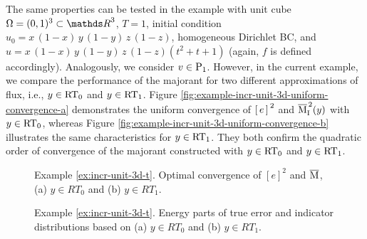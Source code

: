 \begin{example}
\end{example}

\begin{example}
\label{ex:incr-unit-3d-t}

The same properties can be tested in the example with unit cube 
$\Omega = (0, 1)^3 \subset \Rthree$, 
$T = 1$, initial condition $u_0 = x\,(1 - x)\,y\,(1 - y)\,z\,(1 - z)$, 
homogeneous Dirichlet BC, and  
$u = x\,(1 - x)\,y\,(1 - y)\,z\,(1 - z)(t^2 + t + 1)$ (again, $f$ is defined accordingly). 
Analogously, we consider $v \in {\rm P}_{1}$. However, in the current example, we compare the performance of the 
majorant for two different approximations of flux, i.e., $y \in {\rm RT}_{0}$ and $y \in {\rm RT}_{1}$. 
Figure \ref{fig:example-incr-unit-3d-uniform-convergence-a} demonstrates the uniform 
convergence of ${[\,e\,]\,}^2$ and $\overline{\mathrm M}^{\,2}_{\mathrm{I}} (y)$ with $y \in {\rm RT}_{0}$, whereas
Figure \ref{fig:example-incr-unit-3d-uniform-convergence-b} illustrates the same 
characteristics for 
$y \in {\rm RT}_{1}$. They both confirm the quadratic order of convergence of the majorant 
constructed with $y \in {\rm RT}_{0}$ and $y \in {\rm RT}_{1}$. 

\begin{figure}[!ht]
	\centering
	\quad
	\caption{Example \ref{ex:incr-unit-3d-t}. 
	Optimal convergence of $[e]^2$ and $\overline{\mathrm M}_{}$, (a) $y \in {RT}_0$ and (b) $y \in {RT}_1$.}
	\label{fig:example-incr-unit-3d-uniform-convergence}
\end{figure}

\begin{figure}[!ht]
	\centering
	\caption{Example \ref{ex:incr-unit-3d-t}. Energy parts of true error and indicator 	
	distributions based on (a) $y \in {RT}_0$ and (b) $y \in {RT}_1$.}
	\label{fig:example-incr-unit-3d-e-maj-distr}
\end{figure}



\end{example}
